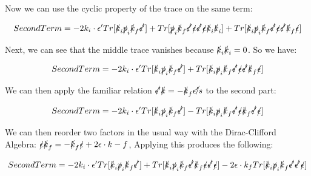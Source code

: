 \documentclass[a4]{article}
\begin{document}
    Now we can use the cyclic property of the trace on the same term:

    \begin{equation}
        Second Term = - 2 k_i \cdot \epsilon' Tr [ \slashed{k}_i \slashed{p}_i \slashed{k}_f \slashed{\epsilon'} ] + Tr[ \slashed{p}_i \slashed{k}_f \slashed{\epsilon'} \slashed{\epsilon} \slashed{\epsilon'} \slashed{\epsilon} \slashed{k}_i \slashed{k}_i ] + Tr[ \slashed{k}_i \slashed{p}_i \slashed{k}_f \slashed{\epsilon'} \slashed{\epsilon} \slashed{\epsilon'} \slashed{k}_f \slashed{\epsilon} ]
    \end{equation}

    Next, we can see that the middle trace vanishes because $\slashed{k}_i \slashed{k}_i = 0$. So we have:

    \begin{equation}
        Second Term = - 2 k_i \cdot \epsilon' Tr [ \slashed{k}_i \slashed{p}_i \slashed{k}_f \slashed{\epsilon'} ] + Tr[ \slashed{k}_i \slashed{p}_i \slashed{k}_f \slashed{\epsilon'} \slashed{\epsilon} \slashed{\epsilon'} \slashed{k}_f \slashed{\epsilon} ]
    \end{equation}

    We can then apply the familiar relation $\slashed{\epsilon'} \slashed{k} = - \slashed{k}_f \slashed{\epsilon's}$ to the second part:

    \begin{equation}
        Second Term = - 2 k_i \cdot \epsilon' Tr [ \slashed{k}_i \slashed{p}_i \slashed{k}_f \slashed{\epsilon'} ] - Tr[ \slashed{k}_i \slashed{p}_i \slashed{k}_f \slashed{\epsilon'} \slashed{\epsilon} \slashed{k}_f \slashed{\epsilon'} \slashed{\epsilon} ]
    \end{equation}

    We can then reorder two factors in the usual way with the Dirac-Clifford Algebra: $\slashed{\epsilon} \slashed{k}_f = - \slashed{k}_f \slashed{\epsilon} + 2 \epsilon \cdot k-f$, Applying this produces the following:

    \begin{equation}
        Second Term = - 2 k_i \cdot \epsilon' Tr [ \slashed{k}_i \slashed{p}_i \slashed{k}_f \slashed{\epsilon'} ] + Tr[ \slashed{k}_i \slashed{p}_i \slashed{k}_f \slashed{\epsilon'} \slashed{k}_f \slashed{\epsilon} \slashed{\epsilon'} \slashed{\epsilon} ] - 2 \epsilon \cdot k_f Tr [ \slashed{k}_i \slashed{p}_i \slashed{k}_f \slashed{\epsilon'} \slashed{\epsilon'} \slashed{\epsilon} ]
    \end{equation}
\end{document}
